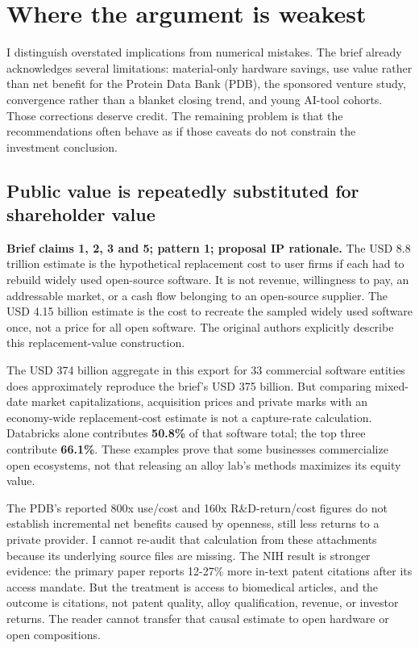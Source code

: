 \section{Where the argument is
weakest}\label{where-the-argument-is-weakest}

I distinguish overstated implications from numerical mistakes. The brief
already acknowledges several limitations: material-only hardware
savings, use value rather than net benefit for the Protein Data Bank
(PDB), the sponsored venture study, convergence rather than a blanket
closing trend, and young AI-tool cohorts. Those corrections deserve
credit. The remaining problem is that the recommendations often behave
as if those caveats do not constrain the investment conclusion.
\citep{InputBrief,InputRecommendations}

\subsection{Public value is repeatedly substituted for shareholder
value}\label{public-value-is-repeatedly-substituted-for-shareholder-value}

\textbf{Brief claims 1, 2, 3 and 5; pattern 1; proposal IP rationale.}
The USD 8.8 trillion estimate is the hypothetical replacement cost to
user firms if each had to rebuild widely used open-source software. It
is not revenue, willingness to pay, an addressable market, or a cash
flow belonging to an open-source supplier. The USD 4.15 billion estimate
is the cost to recreate the sampled widely used software once, not a
price for all open software. The original authors explicitly describe
this replacement-value construction. \citep{Hoffmann2024Value}

The USD 374 billion aggregate in this export for 33 commercial software
entities does approximately reproduce the brief's USD 375 billion. But
comparing mixed-date market capitalizations, acquisition prices and
private marks with an economy-wide replacement-cost estimate is not a
capture-rate calculation. Databricks alone contributes \textbf{50.8\%}
of that software total; the top three contribute \textbf{66.1\%}. These
examples prove that some businesses commercialize open ecosystems, not
that releasing an alloy lab's methods maximizes its equity value.
\citep{InputData}

The PDB's reported 800x use/cost and 160x R\&D-return/cost figures do
not establish incremental net benefits caused by openness, still less
returns to a private provider. I cannot re-audit that calculation from
these attachments because its underlying source files are missing. The
NIH result is stronger evidence: the primary paper reports 12-27\% more
in-text patent citations after its access mandate. But the treatment is
access to biomedical articles, and the outcome is citations, not patent
quality, alloy qualification, revenue, or investor returns. The reader
cannot transfer that causal estimate to open hardware or open
compositions. \citep{Bryan2021}

